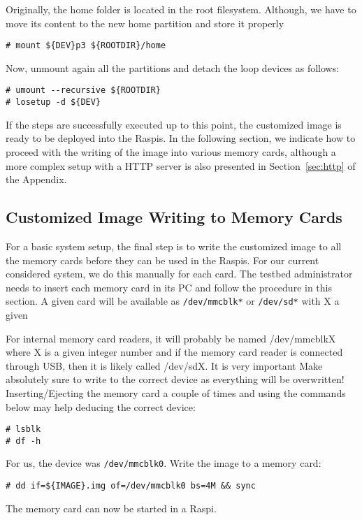 Originally, the home folder is located in the root filesystem. Although,
we have to move its content to the new home partition and store it properly

\begin{lstlisting}[]
# mount ${DEV}p3 ${ROOTDIR}/home
\end{lstlisting}
\FloatBarrier
\vspace{-5mm}
Now, unmount again all the partitions and detach the loop devices as follows:
\begin{lstlisting}[]
# umount --recursive ${ROOTDIR}
# losetup -d ${DEV}
\end{lstlisting}
\FloatBarrier
\vspace{-5mm}

If the steps are successfully executed up to this point, the customized image
is ready to be deployed into the \ac{Raspi}s. In the following section, we
indicate how to proceed with the writing of the image into various memory
cards, although a more complex setup with a \ac{HTTP} server is also presented
in Section~\ref{sec:http} of the Appendix.

\subsection{Customized Image Writing to Memory Cards}
For a basic system setup, the final step is to write the customized image
to all the memory cards before they can be used in the \ac{Raspi}s. For
our current considered system, we do this manually for each card.
The testbed administrator needs to insert each memory card in its \ac{PC}
and follow the procedure in this section. A given card will be available as
\texttt{/dev/mmcblk*} or \texttt{/dev/sd*} with X a given

For internal memory card readers,
it will probably be named /dev/mmcblkX where X is a given integer number
and if the memory card reader is connected through \ac{USB}, then it is likely called /dev/sdX. It is very important Make absolutely sure to write to the correct device as everything will be overwritten!
Inserting/Ejecting the memory card a couple of times and using the commands
below may help deducing the correct device:

\begin{lstlisting}[]
# lsblk
# df -h
\end{lstlisting}
\FloatBarrier
\vspace{-5mm}

For us, the device was \texttt{/dev/mmcblk0}. Write the image to a memory card:
\begin{lstlisting}[]
# dd if=${IMAGE}.img of=/dev/mmcblk0 bs=4M && sync
\end{lstlisting}
\FloatBarrier
\vspace{-5mm}

The memory card can now be started in a \ac{Raspi}.